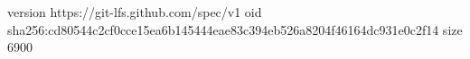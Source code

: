 version https://git-lfs.github.com/spec/v1
oid sha256:cd80544c2cf0cce15ea6b145444eae83c394eb526a8204f46164dc931e0c2f14
size 6900
